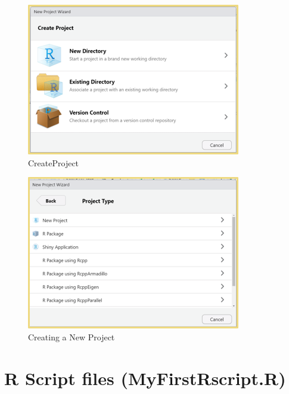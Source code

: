 \documentclass[
  letterpaper,
  DIV=11,
  numbers=noendperiod]{scrreprt}
\begin{document}
\begin{figure}[H]

{\centering \includegraphics{Pictures/Ch0/CreateProject.png}

}

\caption{CreateProject}

\end{figure}%
\begin{figure}[H]

{\centering \includegraphics{Pictures/Ch0/Project.png}

}

\caption{Creating a New Project}

\end{figure}%


\chapter{R Script files
(MyFirstRscript.R)}\label{r-script-files-myfirstrscript.r}
\end{document}
